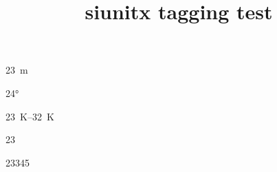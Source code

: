 \documentclass{article}
\title{siunitx tagging test}
\begin{document}
\qty{23}{\meter}


\ang{24}

\qtyrange{23}{32}{\kelvin}


\num{23}

\numlist{23 34 5}
\end{document}
